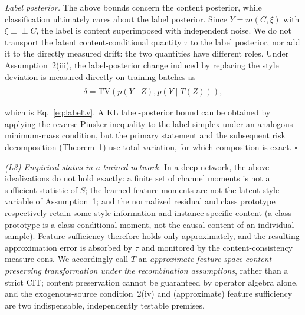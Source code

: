 \documentclass[electronics,article,submit,moreauthors]{Definitions/mdpi}
\newcommand{\add}[1]{\textcolor{addblue}{#1}}
\newcommand{\del}[1]{\textcolor{delred}{\st{#1}}}
\newcommand{\delmath}[1]{\textcolor{delred}{\cancel{#1}}}
\def\add#1{#1}
\def\del#1{}
\def\delmath#1{}
\begin{document}
\emph{Label posterior.} \del{The above bound concerns}\add{The above bounds concern} the content posterior, while classification ultimately cares about the label posterior. Since $Y=m(C,\xi)$ with $\xi\perp\!\!\!\perp C$, the label is content superimposed with \del{independent noise;}\add{independent noise.} \del{by the data-processing inequality for total variation, the portion of content-posterior drift transmitted to the label posterior is at most \mbox{$\tau$}. On the other hand, in Assumption~2(iii), the residual label-posterior change caused by replacing the style deviation does not exceed \mbox{$\delta$} (when \mbox{$D$} is total variation). The triangle inequality for total variation then gives}
\add{We do not transport the latent content-conditional quantity $\tau$ to the label posterior, nor add it to the directly measured drift: the two quantities have different roles. Under Assumption~2(iii), the label-posterior change induced by replacing the style deviation is measured directly on training batches as}
\begin{equation}
\begin{gathered}
\delmath{\mathrm{TV}\!\left(p(Y\mid Z),p(Y\mid T(Z))\right)\le\tau+\delta=\varepsilon(\delta,\tau),}\\
\add{\delta=\mathrm{TV}\!\left(p(Y\mid Z),p(Y\mid T(Z))\right),}
\end{gathered}
\end{equation}
\del{which is Eq.~\mbox{\eqref{eq:labeltv}}. Both bounds vanish as \mbox{$\tau,\delta\to0$}. A KL label-posterior bound can be obtained by applying \mbox{\eqref{eq:revpinsker}} to the label simplex under an analogous minimum-mass condition, but the primary statement and the subsequent risk decomposition (Theorem~1) use total variation, for which composition is exact. \hfill$\square$}
\add{which is Eq.~\eqref{eq:labeltv}. A KL label-posterior bound can be obtained by applying the reverse-Pinsker inequality to the label simplex under an analogous minimum-mass condition, but the primary statement and the subsequent risk decomposition (Theorem~1) use total variation, for which composition is exact. \hfill$\square$}

\noindent\textit{(L3) Empirical status in a trained network.} In a deep network, the above idealizations do not hold exactly: a finite set of channel moments is not a sufficient statistic of $S$; the learned feature moments are not the latent style variable of Assumption~1; and the normalized residual and class prototype respectively retain some style information and instance-specific content (a class prototype is a class-conditional moment, not the causal content of an individual sample). Feature sufficiency therefore holds only approximately, and the resulting approximation error is absorbed by $\tau$ and monitored by the content-consistency measure $\mathrm{cons}$. We accordingly call $T$ an \emph{approximate feature-space content-preserving transformation under the recombination assumptions}, rather than a strict CIT; content preservation cannot be guaranteed by operator algebra alone, and the exogenous-source condition~2(iv) and (approximate) feature sufficiency are two indispensable, independently testable premises.
\end{document}
